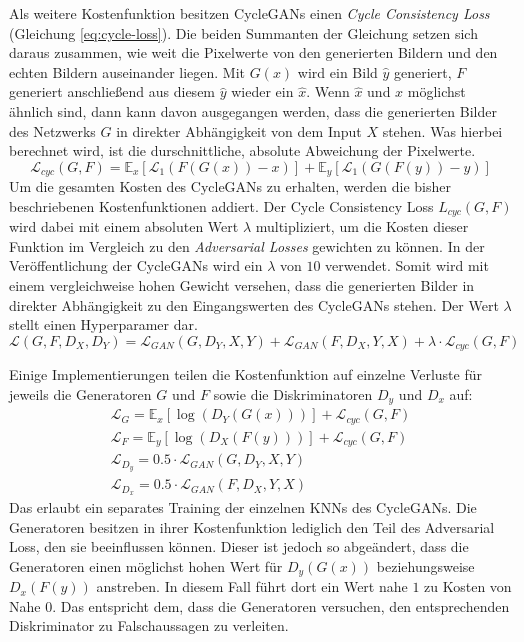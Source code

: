 Als weitere Kostenfunktion besitzen \acp{CycleGAN} einen \emph{Cycle Consistency Loss} (Gleichung \ref{eq:cycle-loss}). Die beiden Summanten der Gleichung setzen sich daraus zusammen, wie weit die Pixelwerte von den generierten Bildern und den echten Bildern auseinander liegen. Mit $G(x)$ wird ein Bild $\hat{y}$ generiert, $F$ generiert anschließend aus diesem $\hat{y}$ wieder ein $\hat{x}$. Wenn $\hat{x}$ und $x$ möglichst ähnlich sind, dann kann davon ausgegangen werden, dass die generierten Bilder des Netzwerks $G$ in direkter Abhängigkeit von dem Input $X$ stehen. Was hierbei berechnet wird, ist die durschnittliche, absolute Abweichung der Pixelwerte. \cite{cycleGAN}
\begin{equation}
   \label{eq:cycle-loss}
	\mathcal{L}_{cyc}(G, F) = \mathbb{E}_x[\mathcal{L}_{1}(F(G(x))-x)] + \mathbb{E}_y[\mathcal{L}_{1}(G(F(y))-y)]
\end{equation}
Um die gesamten Kosten des \acp{CycleGAN} zu erhalten, werden die bisher beschriebenen Kostenfunktionen addiert. Der Cycle Consistency Loss $L_{cyc}(G, F)$ wird dabei mit einem absoluten Wert $\lambda$ multipliziert, um die Kosten dieser Funktion im Vergleich zu den \emph{Adversarial Losses} gewichten zu können. In der Veröffentlichung der \acp{CycleGAN} wird ein $\lambda$ von $10$ verwendet. Somit wird mit einem vergleichweise hohen Gewicht versehen, dass die generierten Bilder in direkter Abhängigkeit zu den Eingangswerten des \acp{CycleGAN} stehen. Der Wert $\lambda$ stellt einen Hyperparamer dar. \cite{cycleGAN}
\begin{equation}
	\mathcal{L}(G, F, D_X, D_Y) = \mathcal{L}_{GAN}(G, D_Y, X, Y) + \mathcal{L}_{GAN}(F, D_X, Y, X) + \lambda \cdot \mathcal{L}_{cyc}(G, F)
\end{equation}
\cite{cycleGAN}

Einige Implementierungen teilen die Kostenfunktion auf einzelne Verluste für jeweils die Generatoren $G$ und $F$ sowie die Diskriminatoren $D_y$ und $D_x$ auf: \cite{cyclegan-tutorial} \cite{cyclegan-resnet}
\begin{subequations}
   \label{eq:cyclegan-losses}
   \begin{align}
      \mathcal{L}_G = \mathbb{E}_x [\log(D_Y(G(x)))] + \mathcal{L}_{cyc}(G, F) \\ 
      \mathcal{L}_F = \mathbb{E}_y [\log(D_X(F(y)))] + \mathcal{L}_{cyc}(G, F) \\
      \mathcal{L}_{D_y} = 0.5 \cdot \mathcal{L}_{GAN}(G, D_Y, X, Y) \\
      \mathcal{L}_{D_x} = 0.5 \cdot \mathcal{L}_{GAN}(F, D_X, Y, X)
\end{align}
\end{subequations}
Das erlaubt ein separates Training der einzelnen \acp{KNN} des \acp{CycleGAN}. Die Generatoren besitzen in ihrer Kostenfunktion lediglich den Teil des Adversarial Loss, den sie beeinflussen können. Dieser ist jedoch so abgeändert, dass die Generatoren einen möglichst hohen Wert für $D_y(G(x))$ beziehungsweise $D_x(F(y))$ anstreben. In diesem Fall führt dort ein Wert nahe $1$ zu Kosten von Nahe $0$. Das entspricht dem, dass die Generatoren versuchen, den entsprechenden Diskriminator zu Falschaussagen zu verleiten.
 
